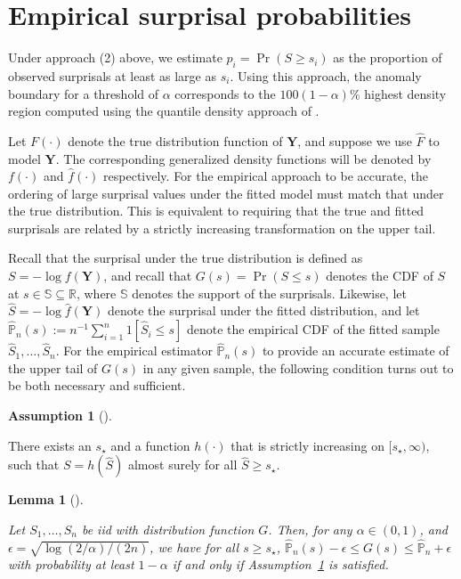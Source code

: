 \documentclass[
  12pt]{article}
\theoremstyle{plain}
\theoremstyle{plain}
\theoremstyle{definition}
\newtheorem{definition}{Assumption}[section]
\theoremstyle{plain}
\newtheorem{lemma}{Lemma}[section]
\theoremstyle{remark}
\begin{document}
\section{Empirical surprisal probabilities}\label{sec-empirical}

Under approach (2) above, we estimate \(p_i=\Pr(S \ge s_i)\) as the
proportion of observed surprisals at least as large as \(s_i\). Using
this approach, the anomaly boundary for a threshold of \(\alpha\)
corresponds to the \(100(1-\alpha)\)\% highest density region computed
using the quantile density approach of \citet{HDR96}.

Let \(F(\cdot)\) denote the true distribution function of \(\bm{Y}\),
and suppose we use \(\widehat{F}\) to model \(\bm{Y}\). The
corresponding generalized density functions will be denoted by
\(f(\cdot)\) and \(\widehat{f}(\cdot)\) respectively. For the empirical
approach to be accurate, the ordering of large surprisal values under
the fitted model must match that under the true distribution. This is
equivalent to requiring that the true and fitted surprisals are related
by a strictly increasing transformation on the upper tail.

Recall that the surprisal under the true distribution is defined as
\(S=-\log f(\bm{Y})\), and recall that \(G(s)=\Pr(S\le s)\) denotes the
CDF of \(S\) at \(s\in\mathbb{S}\subseteq\mathbb{R}\), where
\(\mathbb{S}\) denotes the support of the surprisals. Likewise, let
\(\widehat{S}=-\log \widehat{f}(\bm{Y})\) denote the surprisal under the
fitted distribution, and let
\(\widehat{\mathbb{P}}_n(s):=n^{-1}\sum_{i=1}^{n}1[\widehat{S}_i\le s]\)
denote the empirical CDF of the fitted sample
\(\widehat{S}_1,\dots,\widehat{S}_n\). For the empirical estimator
\(\widehat{\mathbb{P}}_n(s)\) to provide an accurate estimate of the
upper tail of \(G(s)\) in any given sample, the following condition
turns out to be both necessary and sufficient.

\begin{definition}[]\protect\hypertarget{def-empirical_pis}{}\label{def-empirical_pis}

There exists an \(s_\star\) and a function \(h(\cdot)\) that is strictly
increasing on \([s_\star, \infty)\), such that \(S=h(\widehat{S})\)
almost surely for all \(\widehat{S} \ge s_\star\).

\end{definition}

\begin{lemma}[]\protect\hypertarget{lem-confident}{}\label{lem-confident}

Let \(S_1,\dots, S_n\) be iid with distribution function \(G\). Then,
for any \(\alpha \in(0,1)\), and
\(\epsilon = \sqrt{\log(2/\alpha)/(2n)}\), we have for all
\(s \ge s_\star\),
\(\widehat{\mathbb{P}}_n(s)-\epsilon \leq G(s) \leq \widehat{\mathbb{P}}_n+\epsilon\)
with probability at least \(1-\alpha\) if and only if
Assumption~\ref{def-empirical_pis} is satisfied.

\end{lemma}
\end{document}

